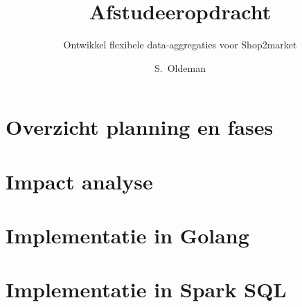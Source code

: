 \documentclass[whitelogo]{tudelft-report}
\begin{document}
% 
\frontmatter


\title[tudelft-white]{Afstudeeropdracht}
\subtitle[tudelft-black]{Ontwikkel flexibele data-aggregaties voor Shop2market}
\author[tudelft-white]{S.\ Oldeman}






\tableofcontents

 

\mainmatter

\setlength{\parskip}{1em}






% 





\appendix

\chapter{Overzicht planning en fases}
\label{app:planning}


\chapter{Impact analyse}
\label{app:impact_analyse}


\chapter{Implementatie in Golang}
\label{app:golang_code}


\chapter{Implementatie in Spark SQL}
\label{app:spark_code}


\printbibliography
\end{document}
